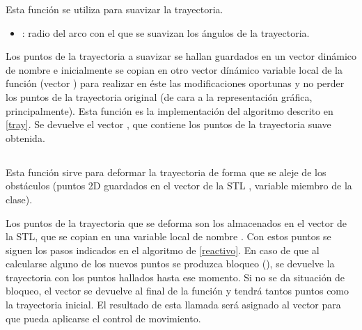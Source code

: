 \noindent
Esta función se utiliza para suavizar la trayectoria.
\begin{itemize}
  \item {}: radio del arco con el que se suavizan los ángulos de la trayectoria.
\end{itemize}

\noindent
Los puntos de la trayectoria a suavizar se hallan guardados en un vector dinámico de nombre  e inicialmente se copian en otro vector dínámico variable local de la función (vector ) para realizar en éste las modificaciones oportunas y no perder los puntos de la trayectoria original (de cara a la representación gráfica, principalmente).
Esta función es la implementación del algoritmo descrito en \ref{tray}. Se devuelve el vector , que contiene los puntos de la trayectoria suave obtenida.

\subsection{}

\noindent
{}

\noindent
Esta función sirve para deformar la trayectoria de forma que se aleje de los obstáculos (puntos 2D guardados en el vector de la STL , variable miembro de la clase).

\noindent
Los puntos de la trayectoria que se deforma son los almacenados en el vector  de la STL, que se copian en una variable local de nombre . Con estos puntos se siguen los pasos indicados en el algoritmo de \ref{reactivo}. En caso de que al calcularse alguno de los nuevos puntos se produzca bloqueo (), se devuelve la trayectoria  con los puntos hallados hasta ese momento. Si no se da situación de bloqueo, el vector  se devuelve al final de la función y tendrá tantos puntos como la trayectoria inicial. El resultado de esta llamada será asignado al vector  para que pueda aplicarse el control de movimiento.

%
%
%

